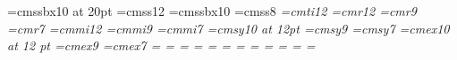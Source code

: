 %
%
%
% 
%
%
% 
%	
%


\parindent0pt		%
\parskip0pt		%

\def\StandardAspect{%
\pdfpagewidth=120mm	%
\pdfpageheight=90mm	%
\vsize=67mm		%
\hsize=110mm		%
\hoffset=-20.4mm	%
\voffset=-12.4mm	%
}

\def\WideAspect{%
\pdfpagewidth=144mm	%
\pdfpageheight=90mm	%
\vsize=67mm		%
\hsize=134mm		%
\hoffset=-20.4mm	%
\voffset=-12.4mm	%
}


%
%
\font\titlefont=cmssbx10 at 20pt %
\font\normalfont=cmss12		 %
\font\slidetitlefont=cmssbx10    %
\font\linkbarfont=cmss8		 %
\font\it=cmti12
%
\baselineskip=15pt
\font\tfont=cmr12
\font\sfont=cmr9
\font\ssfont=cmr7
\font\tifont=cmmi12
\font\sifont=cmmi9
\font\ssifont=cmmi7
\font\tsyfont=cmsy10 at 12pt
\font\ssyfont=cmsy9
\font\sssyfont=cmsy7
\font\texfont=cmex10 at 12 pt
\font\sexfont=cmex9
\font\ssexfont=cmex7
%
=\tfont
{}=\sfont
{}=\ssfont
{}=\tifont
{}=\sifont
{}=\ssifont
{}=\tsyfont
{}=\ssyfont
{}=\sssyfont
{}=\texfont
{}=\sexfont
{}=\ssexfont
%

